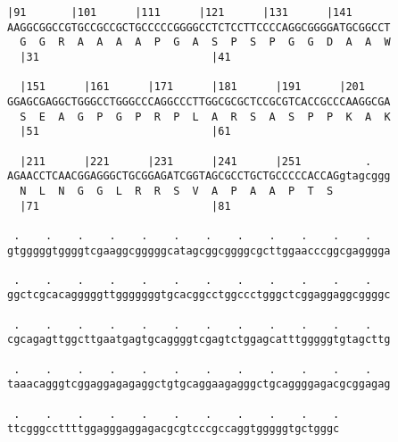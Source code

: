 \documentclass{article}
\begin{document}
\newpage
\begin{Verbatim}[fontfamily=courier]
  |91       |101      |111      |121      |131      |141    
AAGGCGGCCGTGCCGCCGCTGCCCCCGGGGCCTCTCCTTCCCCAGGCGGGGATGCGGCCT
  G  G  R  A  A  A  A  P  G  A  S  P  S  P  G  G  D  A  A  W
  |31                           |41                         

  |151      |161      |171      |181      |191      |201    
GGAGCGAGGCTGGGCCTGGGCCCAGGCCCTTGGCGCGCTCCGCGTCACCGCCCAAGGCGA
  S  E  A  G  P  G  P  R  P  L  A  R  S  A  S  P  P  K  A  K
  |51                           |61                         

  |211      |221      |231      |241      |251          .   
AGAACCTCAACGGAGGGCTGCGGAGATCGGTAGCGCCTGCTGCCCCCACCAGgtagcggg
  N  L  N  G  G  L  R  R  S  V  A  P  A  A  P  T  S         
  |71                           |81                         

 .    .    .    .    .    .    .    .    .    .    .    .   
gtgggggtggggtcgaaggcgggggcatagcggcggggcgcttggaacccggcgagggga

 .    .    .    .    .    .    .    .    .    .    .    .   
ggctcgcacagggggttgggggggtgcacggcctggccctgggctcggaggaggcggggc

 .    .    .    .    .    .    .    .    .    .    .    .   
cgcagagttggcttgaatgagtgcaggggtcgagtctggagcatttgggggtgtagcttg

 .    .    .    .    .    .    .    .    .    .    .    .   
taaacagggtcggaggagagaggctgtgcaggaagagggctgcaggggagacgcggagag

 .    .    .    .    .    .    .    .    .    .    .
ttcgggccttttggagggaggagacgcgtcccgccaggtgggggtgctgggc
\end{Verbatim}
\newpage
\end{document}

